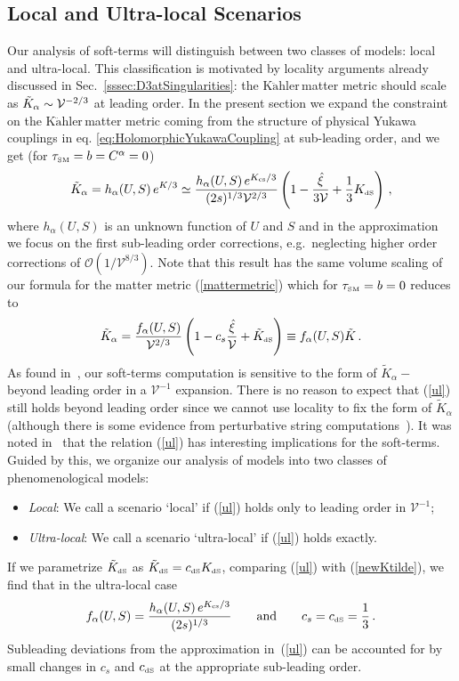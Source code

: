 \documentclass[12pt,a4paper]{book}
\newcommand{\Kahler}{\ensuremath{\text{K}\ddot{\text{a}}\text{hler}\,}}
\def\SM{{\scriptscriptstyle \rm SM}}
\def\dS{{\scriptscriptstyle \rm dS}}
\newcommand{\mc}{\mathcal}
\newcommand{\V}{{\cal{V}}}
\begin{document}
\subsection{Local and Ultra-local Scenarios}
\label{soft}

Our analysis of soft-terms will distinguish between two classes of models: local and ultra-local. This classification is motivated by locality arguments already discussed in Sec.~\ref{sssec:D3atSingularities}: the \Kahler matter metric should scale as $\tilde{K}_\alpha \sim  \V^{-2/3}$ at leading order. In the present section we expand the constraint on the \Kahler matter metric coming from the structure of physical Yukawa couplings in eq. \eqref{eq:HolomorphicYukawaCoupling} at sub-leading order, and we get (for $\tau_\SM = b= C^\alpha= 0$)
\begin{align}
\label{ul}
\tilde{K}_\alpha = h_\alpha(U,S)\,e^{K/3} \simeq  \frac{h_\alpha(U,S)\,e^{K_{\rm cs}/3}}{(2s)^{1/3}\mathcal{V}^{2/3}} \left(1- \frac{\hat\xi}{3\mathcal{V}}  + \frac 13 K_\dS\right)\,,
\end{align}
where $h_\alpha(U,S)$ is an unknown function of $U$ and $S$ and in the approximation we focus on the first sub-leading order corrections, e.g.~neglecting higher order corrections of $\mc{O}\left(1/\mathcal{V}^{8/3}\right)$. Note that this result has the same volume scaling of our formula for the matter metric (\ref{mattermetric}) which for $\tau_\SM = b= 0$ reduces to
\begin{align}
\tilde{K}_{\alpha} = \frac{f_\alpha(U,S)}{\mathcal{V}^{2/3}} \left(1 - c_s \frac{\hat\xi}{\mathcal{V}}
+ \tilde{K}_\dS\right)\equiv f_\alpha(U,S)\tilde{K}\,.
\label{newKtilde}
\end{align}
As found in~\cite{Blumenhagen:2009gk}, our soft-terms computation is sensitive to the form of $\tilde{K}_\alpha-$
beyond leading order in a $\mathcal{V}^{-1}$ expansion. There is no reason to expect that (\ref{ul}) still holds beyond leading order since we cannot use locality to fix the form of $\tilde{K}_\alpha$ (although there is some evidence from perturbative string computations~\cite{Conlon:2011jq}). It was noted in~\cite{Blumenhagen:2009gk} that the relation (\ref{ul}) has interesting implications for the soft-terms. Guided by this, we organize our analysis of models into two classes of phenomenological models:
\begin{itemize}
\item {\it Local}: We call a scenario `local' if (\ref{ul}) holds only to leading order in $\mathcal{V}^{-1}$;
\item {\it Ultra-local}: We call a scenario `ultra-local' if (\ref{ul}) holds exactly.
\end{itemize}
If we parametrize $\tilde{K}_\dS$ as $\tilde{K}_\dS  =  c_\dS K_\dS$,
comparing (\ref{ul}) with (\ref{newKtilde}), we find that in the ultra-local case
\begin{align}
f_{\alpha}(U,S) = \frac{h_\alpha(U,S)\,e^{K_{\rm cs}/3}}{(2s)^{1/3}}\qquad \text{and}\qquad c_s=c_\dS=\frac 13\,.
\label{fdef}
\end{align}
Subleading deviations from the approximation in~(\ref{ul}) can be accounted for by small changes in $c_s$ and $c_\dS$ at the appropriate sub-leading order.
\end{document}

